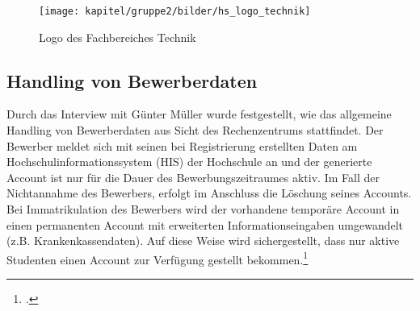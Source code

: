 \begin{figure}[h!]
	\centering
	\texttt{[image: kapitel/gruppe2/bilder/hs\_logo\_technik]}
	\caption{Logo des Fachbereiches Technik\protect\footnotemark}
	\label{fig_logo_fb_technik}
\end{figure}

\subsection{Handling von Bewerberdaten}
Durch das Interview mit Günter Müller wurde festgestellt, wie das allgemeine Handling von Bewerberdaten aus Sicht des Rechenzentrums stattfindet. 
Der Bewerber meldet sich mit seinen bei Registrierung erstellten Daten am Hochschulinformationssystem (HIS) der Hochschule an und der generierte Account ist nur für die Dauer des Bewerbungszeitraumes aktiv. Im Fall der Nichtannahme des Bewerbers, erfolgt im Anschluss die Löschung seines Accounts. Bei Immatrikulation des Bewerbers wird der vorhandene temporäre Account in einen permanenten Account mit erweiterten Informationseingaben umgewandelt (z.B. Krankenkassendaten). Auf diese Weise wird sichergestellt, dass nur aktive Studenten einen Account zur Verfügung gestellt bekommen.\footcite{gunter_muller_interview}
\clearpage